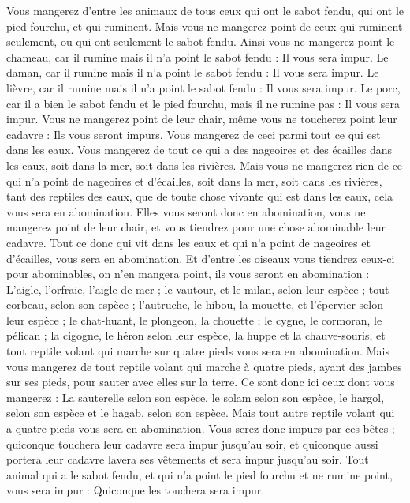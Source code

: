 \begin{multicols}{2}
Vous mangerez d'entre les animaux de tous ceux qui ont le sabot fendu, qui ont le pied fourchu, et qui ruminent.
Mais vous ne mangerez point de ceux qui ruminent seulement, ou qui ont seulement le sabot fendu. Ainsi vous ne mangerez point le chameau, car il rumine mais il n'a point le sabot fendu : Il vous sera impur.
Le daman, car il rumine mais il n'a point le sabot fendu : Il vous sera impur.
Le lièvre, car il rumine mais il n'a point le sabot fendu : Il vous sera impur.
Le porc, car il a bien le sabot fendu et le pied fourchu, mais il ne rumine pas : Il vous sera impur.
Vous ne mangerez point de leur chair, même vous ne toucherez point leur cadavre : Ils vous seront impurs.
Vous mangerez de ceci parmi tout ce qui est dans les eaux. Vous mangerez de tout ce qui a des nageoires et des écailles dans les eaux, soit dans la mer, soit dans les rivières.
Mais vous ne mangerez rien de ce qui n'a point de nageoires et d'écailles, soit dans la mer, soit dans les rivières, tant des reptiles des eaux, que de toute chose vivante qui est dans les eaux, cela vous sera en abomination.
Elles vous seront donc en abomination, vous ne mangerez point de leur chair, et vous tiendrez pour une chose abominable leur cadavre.
Tout ce donc qui vit dans les eaux et qui n'a point de nageoires et d'écailles, vous sera en abomination.
Et d'entre les oiseaux vous tiendrez ceux-ci pour abominables, on n'en mangera point, ils vous seront en abomination : L'aigle, l'orfraie, l’aigle de mer ;
le vautour, et le milan, selon leur espèce ;
tout corbeau, selon son espèce ;
l’autruche, le hibou, la mouette, et l'épervier selon leur espèce ;
le chat-huant, le plongeon, la chouette ;
le cygne, le cormoran, le pélican ;
la cigogne, le héron selon leur espèce, la huppe et la chauve-souris,
et tout reptile volant qui marche sur quatre pieds vous sera en abomination.
Mais vous mangerez de tout reptile volant qui marche à quatre pieds, ayant des jambes sur ses pieds, pour sauter avec elles sur la terre.
Ce sont donc ici ceux dont vous mangerez : La sauterelle selon son espèce, le solam selon son espèce, le hargol, selon son espèce et le hagab, selon son espèce.
Mais tout autre reptile volant qui a quatre pieds vous sera en abomination.
Vous serez donc impurs par ces bêtes ; quiconque touchera leur cadavre sera impur jusqu'au soir,
et quiconque aussi portera leur cadavre lavera ses vêtements et sera impur jusqu'au soir.
Tout animal qui a le sabot fendu, et qui n'a point le pied fourchu et ne rumine point, vous sera impur : Quiconque les touchera sera impur.

\end{multicols}
